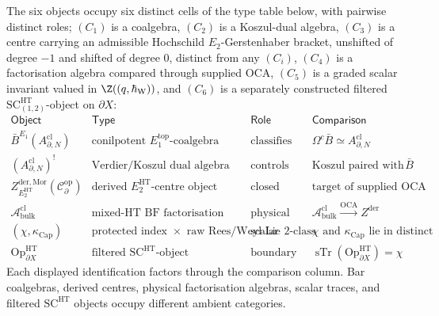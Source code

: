 \begin{prop}\label{prop:boundary-open-closed-type-table}
The six objects occupy six distinct cells of the type table below,
with pairwise distinct roles; \((C_1)\) is a coalgebra,
\((C_2)\) is a Koszul-dual algebra, \((C_3)\) is a centre carrying an
admissible Hochschild \(E_2\)-Gerstenhaber bracket, unshifted of degree
\(-1\) and shifted of degree \(0\), distinct from any \((C_i)\),
\((C_4)\) is a factorisation algebra compared through supplied
\(\mathrm{OCA}\),
\((C_5)\) is a graded scalar invariant valued in
\(\Z((q,\hbar_{\mathrm{W}}))\), and \((C_6)\) is a separately constructed filtered
\(\mathrm{SC}^{\mathrm{HT}}_{(1,2)}\)-object on \(\partial X\):
\[
  \renewcommand{\arraystretch}{1.25}
  \begin{array}{l|l|l|l}
    \mathsf{Object} & \mathsf{Type} & \mathsf{Role} & \mathsf{Comparison}\\\hline
    \bar B^{E_1}(A^{\mathrm{cl}}_{\partial,N}) &
      \text{conilpotent }E_1^{\mathrm{top}}\text{-coalgebra} &
      \text{classifies twisting morphisms} &
      \Omega^c\bar B\simeq A^{\mathrm{cl}}_{\partial,N}\\
    (A^{\mathrm{cl}}_{\partial,N})^! &
      \text{Verdier/Koszul dual algebra} &
      \text{controls line/open dual modules} &
      \text{Koszul paired with }\bar B\\
    Z^{\mathrm{der},\mathrm{Mor}}_{E_2^{\mathrm{HT}}}(\mathcal C^{\mathrm{op}}_\partial) &
      \text{derived }E_2^{\mathrm{HT}}\text{-centre object} &
      \text{closed centre before physical realisation} &
      \text{target of supplied }\mathrm{OCA}\\
    \mathcal A^{\mathrm{cl}}_{\mathrm{bulk}} &
      \text{mixed-HT BF factorisation algebra} &
      \text{physical bulk if realised} &
      \mathcal A^{\mathrm{cl}}_{\mathrm{bulk}}\xrightarrow{\mathrm{OCA}}Z^{\mathrm{der}}\\
    (\chi,\kappa_{\mathrm{Cap}}) &
      \text{protected index }\times\text{ raw Rees/Weyl Lie }2\text{-class} &
      \text{scalar invariant and raw projective anomaly} &
      \chi\text{ and }\kappa_{\mathrm{Cap}}\text{ lie in distinct targets}\\
    \mathrm{Op}^{\mathrm{HT}}_{\partial X} &
      \text{filtered }\mathrm{SC}^{\mathrm{HT}}\text{-object} &
      \text{boundary operator datum} &
      \operatorname{sTr}(\mathrm{Op}^{\mathrm{HT}}_{\partial X})=\chi
  \end{array}
\]
Each displayed identification factors through the comparison
column.  Bar coalgebras, derived centres, physical factorisation
algebras, scalar traces, and filtered \(\mathrm{SC}^{\mathrm{HT}}\)
objects occupy different ambient categories.
\end{prop}

